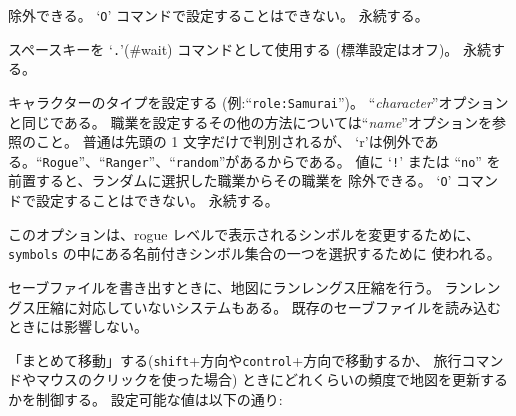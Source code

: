 除外できる。
`{\tt O}' コマンドで設定することはできない。
永続する。
\item[\ib{rest\verb+_+on\verb+_+space}]
スペースキーを `{\tt .}'(\#wait) コマンドとして使用する
(標準設定はオフ)。
永続する。
\item[\ib{role}]
キャラクターのタイプを設定する (例:``{\tt role:Samurai}'')。
``{\it character\/}''オプションと同じである。
職業を設定するその他の方法については``{\it name\/}''オプションを参照のこと。
普通は先頭の 1 文字だけで判別されるが、
`r'は例外である。``{\tt Rogue}''、``{\tt Ranger}''、``{\tt random}''があるからである。
値に `{\tt !}' または ``{\tt no}'' を前置すると、ランダムに選択した職業からその職業を
除外できる。
`{\tt O}' コマンドで設定することはできない。
永続する。
\item[\ib{roguesymset}]
このオプションは、rogue レベルで表示されるシンボルを変更するために、
{\tt symbols} の中にある名前付きシンボル集合の一つを選択するために
使われる。
\item[\ib{rlecomp}]
セーブファイルを書き出すときに、地図にランレングス圧縮を行う。
ランレングス圧縮に対応していないシステムもある。
既存のセーブファイルを読み込むときには影響しない。
\item[\ib{runmode}]
「まとめて移動」する({\tt shift}+方向や{\tt control}+方向で移動するか、
旅行コマンドやマウスのクリックを使った場合)
ときにどれくらいの頻度で地図を更新するかを制御する。
設定可能な値は以下の通り:

